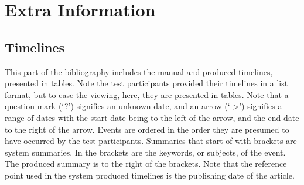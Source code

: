 \chapter{Extra Information}

\section{Timelines}
\par This part of the bibliography includes the manual and produced timelines, presented in tables. Note the test participants provided their timelines in a list format, but to ease the viewing, here, they are presented in tables. Note that a question mark (`?') signifies an unknown date, and an arrow (`->') signifies a range of dates with the start date being to the left of the arrow, and the end date to the right of the arrow. Events are ordered in the order they are presumed to have occurred by the test participants. Summaries that start of with brackets are system summaries. In the brackets are the keywords, or subjects, of the event. The produced summary is to the right of the brackets. Note that the reference point used in the system produced timelines is the publishing date of the article.
